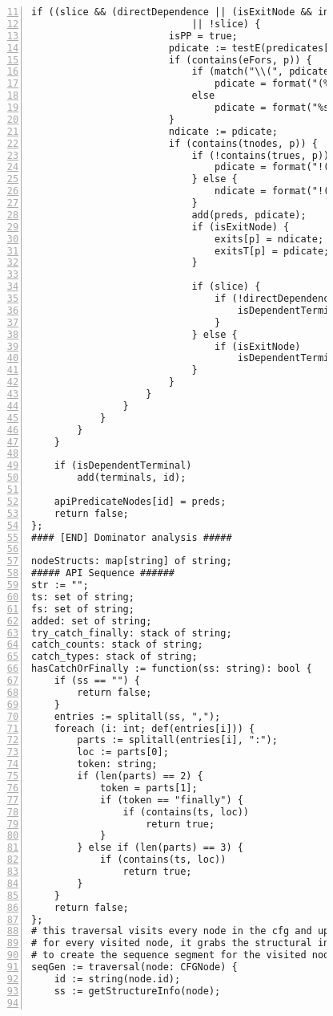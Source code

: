 \begin{figure}[ht!]
\begin{lstlisting}[numbers=left, tabsize=4, escapechar=@, caption={API Usage Mining Analysis},label={lst:aun-code}, firstline = 11, firstnumber = 11, lastline = 60]
                    if ((slice && (directDependence || (isExitNode && indirectDependence))) 
                            || !slice) {
                        isPP = true;
                        pdicate := testE(predicates[p]);
                        if (contains(eFors, p)) {
                            if (match("\\(", pdicate)) 
                                pdicate = format("(%s).size() > 0", pdicate);
                            else
                                pdicate = format("%s.size() > 0", pdicate);
                        }
                        ndicate := pdicate;
                        if (contains(tnodes, p)) {
                            if (!contains(trues, p)) {
                                pdicate = format("!(%s)", pdicate);
                            } else {
                                ndicate = format("!(%s)", ndicate);    
                            }
                            add(preds, pdicate);    
                            if (isExitNode) {
                                exits[p] = ndicate;
                                exitsT[p] = pdicate;
                            }

                            if (slice) {
                                if (!directDependence) {
                                    isDependentTerminal = true;
                                }
                            } else {
                                if (isExitNode)
                                    isDependentTerminal = true;	
                            }
                        }
                    } 
                } 
            }
        }
    } 

    if (isDependentTerminal)
        add(terminals, id);
    
    apiPredicateNodes[id] = preds;
    return false;
};
#### [END] Dominator analysis #####

nodeStructs: map[string] of string;
##### API Sequence ######
str := "";
ts: set of string;
fs: set of string;
added: set of string;
try_catch_finally: stack of string;
catch_counts: stack of string;
catch_types: stack of string;
hasCatchOrFinally := function(ss: string): bool {
    if (ss == "") {
        return false;    
    }
    entries := splitall(ss, ",");
    foreach (i: int; def(entries[i])) {
        parts := splitall(entries[i], ":");
        loc := parts[0];
        token: string;
        if (len(parts) == 2) {
            token = parts[1];
            if (token == "finally") {
                if (contains(ts, loc))
                    return true;
            }
        } else if (len(parts) == 3) {
            if (contains(ts, loc))
                return true;
        }
    }
    return false;
};
# this traversal visits every node in the cfg and updates the sequence
# for every visited node, it grabs the structural information, api calls, and preconditions
# to create the sequence segment for the visited node.
seqGen := traversal(node: CFGNode) {
	id := string(node.id);
	ss := getStructureInfo(node);
	

\end{lstlisting}
\end{figure}
